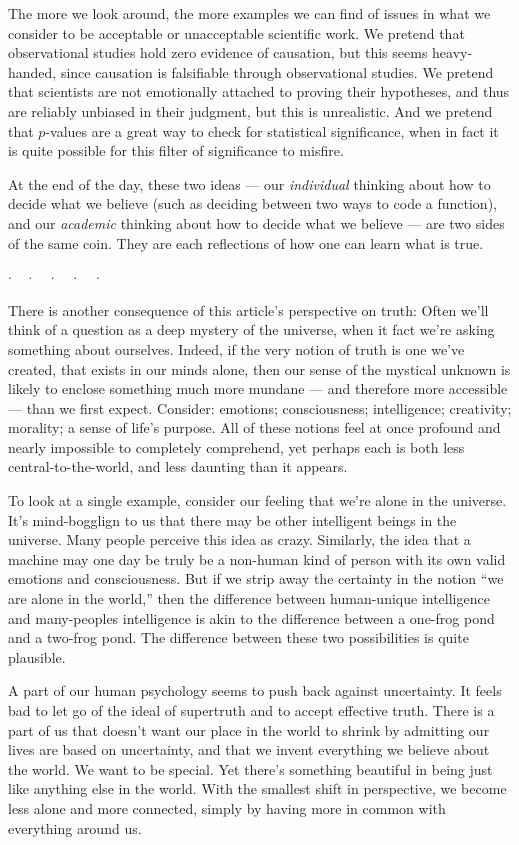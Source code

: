 \documentclass[11pt, oneside]{article}   	%
\newcommand{\dotq}{\cdot\quad}
\newcommand{\scenebreak}{
    \medskip\centerline{$\dotq\dotq\dotq\dotq\cdot$}\medskip
}
\begin{document}
The more we look around, the more examples we can find of issues in what we
consider to be acceptable or unacceptable scientific work.
We pretend that observational studies hold zero evidence of causation, but this
seems heavy-handed, since causation is falsifiable through observational
studies. We pretend that scientists are not emotionally attached to proving
their hypotheses, and thus are reliably unbiased in their judgment, but this is
unrealistic. And we pretend that $p$-values are a great way to check for
statistical significance, when in fact it is quite possible for this filter of
significance to misfire.

At the end of the day, these two ideas --- our {\em individual}
thinking about how to
decide what we believe (such as deciding between two ways to code a function),
and our {\em academic} thinking about how to decide what we believe --- are two
sides of the same coin. They are each reflections of how one can learn what is
true.

\scenebreak

There is another consequence of this article's perspective on truth:
Often we'll think of a question as a deep mystery of the
universe, when it fact we're asking something about ourselves.
Indeed, if the very notion of truth is one we've created, that exists in our
minds alone, then our sense of the mystical unknown is likely to enclose
something much more mundane --- and therefore more accessible --- than we first
expect.
Consider:
emotions; consciousness; intelligence; creativity; morality; a sense of life's
purpose. All of these notions feel at once profound and nearly impossible to
completely comprehend, yet perhaps each is both less central-to-the-world, and
less daunting than it appears.

To look at a single example, consider our feeling that we're alone in the
universe.
It's mind-bogglign to us that there may be other intelligent beings in the
universe. Many people perceive this idea as crazy.
Similarly, the idea that a machine may one day be truly be a non-human kind of
person with its own valid emotions and consciousness.
But if we strip away the certainty in the notion ``we are alone
in the world,'' then the difference between human-unique intelligence and
many-peoples intelligence is akin to the difference between a one-frog pond
and a two-frog pond. The difference between these two possibilities is quite
plausible.

A part of our human psychology seems to push back against uncertainty. It
feels bad to let go of the ideal of supertruth and to accept effective
truth. There is a part of us that doesn't want our place in the world to
shrink by admitting our lives are based on uncertainty, and that we invent
everything we believe about the world.
We want to be special. Yet there's something beautiful in being just
like anything else in the world. With the smallest shift in perspective,
we become
less alone and more connected, simply by having more in common with everything
around us.
\end{document}
